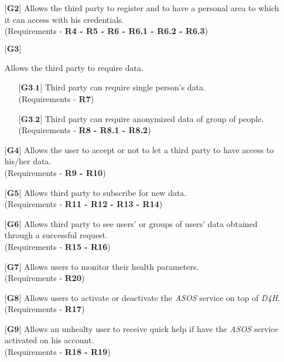 \begin{itemize}
	\item[${\textbf{[G2]}}$] {Allows the third party to register and to have a personal area to which it can access with his 				credentials.\\(Requirements - \textbf{R4 - R5 - R6 - R6.1 - R6.2 - R6.3})}
	\item[${\textbf{[G3]}}$] {Allows the third party to require data.
				\begin{itemize}
					\item[${\textbf{[G3.1]}}$] {Third party can require single person's data.\\(Requirements - 								\textbf{R7})}
					\item[${\textbf{[G3.2]}}$] {Third party can require anonymized data of group of people.\\ 								(Requirements - \textbf{R8 - R8.1 - R8.2})}
				\end{itemize}}
	\item[${\textbf{[G4]}}$] {Allows the user to accept or not to let a third party to have access to his/her data.\\(Requirements - 	\textbf{R9 - R10})}
	\item[${\textbf{[G5]}}$] {Allows third party to subscribe for new data.\\(Requirements - \textbf{R11 - R12 - R13 - R14})}
	\item[${\textbf{[G6]}}$] {Allows third party to see users' or groups of users' data obtained through a successful request.\\			(Requirements - \textbf{R15 - R16})}
	\item[${\textbf{[G7]}}$] {Allows users to monitor their health parameters.\\(Requirements - \textbf{R20})}
	\item[${\textbf{[G8]}}$] {Allows users to activate or deactivate the \hbox{\emph{ASOS}} service on top of \hbox{\emph{D4H}}.\\(Requirements - \textbf{R17})}
	\item[${\textbf{[G9]}}$] {Allows an unhealty user to receive quick help if have the \hbox{\emph{ASOS}} service activated on his account.\\(Requirements - \textbf{R18 - R19})}

	
\end{itemize}